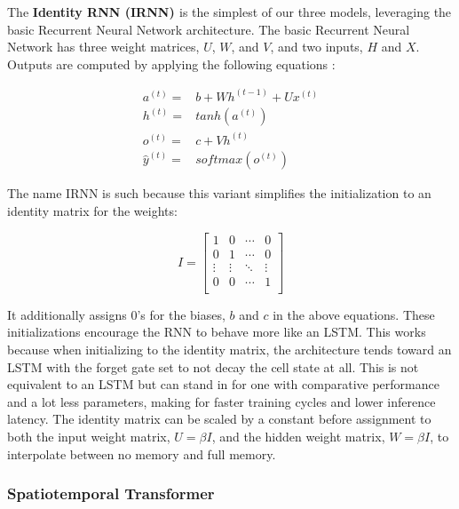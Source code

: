 \documentclass[10pt,twocolumn,letterpaper]{article}
\begin{document}
    The \textbf{Identity RNN (IRNN) \cite{irnn_initialize}} is the simplest of our three models, leveraging the basic Recurrent Neural Network architecture. The basic Recurrent Neural Network has three weight matrices, $U$, $W$, and $V$, and two inputs, $H$ and $X$. Outputs are computed by applying the following equations \cite{deep_learning_book}:

    \begin{align}
        a^{(t)} =& b + W h^{(t-1)} + U x^{(t)} \\
        h^{(t)} =& tanh(a^{(t)}) \\
        o^{(t)} =& c + V h^{(t)} \\
        \hat{y}^{(t)} =& softmax(o^{(t)})
    \end{align}

    The name IRNN is such because this variant simplifies the initialization to an identity matrix for the weights: 

    \begin{equation}
        \renewcommand\arraystretch{2}
        I = \begin{bmatrix}
            1 & 0 & \cdots & 0 \\
            0 & 1 & \cdots & 0 \\
            \vdots & \vdots & \ddots & \vdots \\
            0 & 0 & \cdots & 1 \\
        \end{bmatrix}
    \end{equation}

    It additionally assigns 0’s for the biases, $b$ and $c$ in the above equations. These initializations encourage the RNN to behave more like an LSTM. This works because when initializing to the identity matrix, the architecture tends toward an LSTM with the forget gate set to not decay the cell state at all. This is not equivalent to an LSTM but can stand in for one with comparative performance and a lot less parameters, making for faster training cycles and lower inference latency. The identity matrix can be scaled by a constant before assignment to both the input weight matrix, $U = \beta I$, and the hidden weight matrix, $W= \beta I$, to interpolate between no memory and full memory.

    \subsubsection{Spatiotemporal Transformer}
\end{document}
